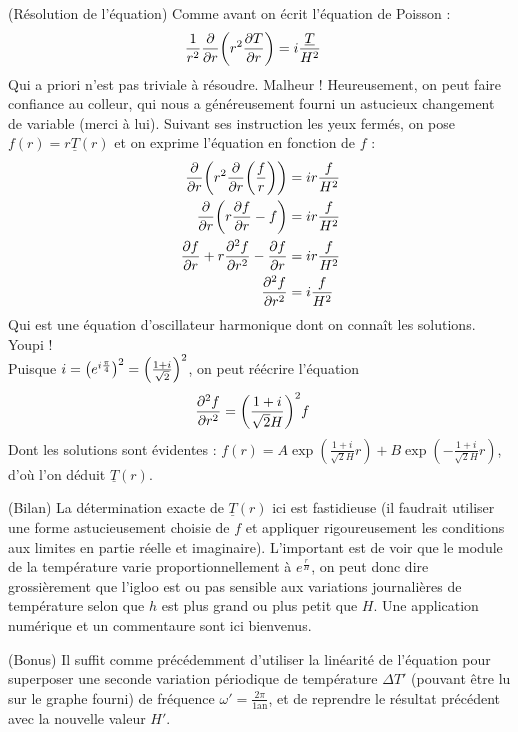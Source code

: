 \begin{solution}
\begin{questions}
    \question (\textsf{Résolution de l'équation}) Comme avant on écrit l'équation de Poisson :
    \begin{align*}
        \frac1{r^2} \pdv{r}\qty(r^2\pdv{T}{r}) &= i \frac{\underline{T}}{H^2}
    \end{align*}
    Qui a priori n'est pas triviale à résoudre. Malheur ! Heureusement, on peut faire confiance au colleur, qui nous a généreusement fourni un astucieux changement de variable (merci à lui). Suivant ses instruction les yeux fermés, on pose $f(r) = r \underline{T}(r)$ et on exprime l'équation en fonction de $f$ :
    \begin{align*}
        \pdv{r}\qty(r^2\pdv{r}\qty(\frac{f}{r})) &= i r\frac{f}{H^2} \\
        \pdv{r}\qty(r\pdv{f}{r} - f) &= i r\frac{f}{H^2} \\
        \pdv{f}{r} + r\pdv[2]{f}{r} - \pdv{f}{r} &= i r\frac{f}{H^2} \\
        \pdv[2]{f}{r} &= i \frac{f}{H^2}
    \end{align*}
    Qui est une équation d'oscillateur harmonique dont on connaît les solutions. Youpi ! \\
    Puisque $i = \qty(e^{i\frac{\pi}{4}})^2 = \qty(\frac{1+i}{\sqrt{2}})^2$, on peut réécrire l'équation
    \begin{align*}
        \pdv[2]{f}{r} &= \qty(\frac{1+i}{\sqrt{2}H})^2 f
    \end{align*}
    Dont les solutions sont évidentes : $f(r) = A\exp(\frac{1+i}{\sqrt{2}H}r) + B\exp(-\frac{1+i}{\sqrt{2}H}r)$, d'où l'on déduit $\underline{T}(r)$.
    
    \question (\textsf{Bilan}) La détermination exacte de $\underline{T}(r)$ ici est fastidieuse (il faudrait utiliser une forme astucieusement choisie de $f$ et appliquer rigoureusement les conditions aux limites en partie réelle et imaginaire). L'important est de voir que le module de la température varie proportionnellement à $e^{\frac{r}{H}}$, on peut donc dire grossièrement que l'igloo est ou pas sensible aux variations journalières de température selon que $h$ est plus grand ou plus petit que $H$. Une application numérique et un commentaure sont ici bienvenus.
    
    \question (\textsf{Bonus}) Il suffit comme précédemment d'utiliser la linéarité de l'équation pour superposer une seconde variation périodique de température $\Delta T '$ (pouvant être lu sur le graphe fourni) de fréquence $\omega' = \frac{2\pi}{1 \text{an}}$, et de reprendre le résultat précédent avec la nouvelle valeur $H'$.
\end{questions}


\end{solution}
